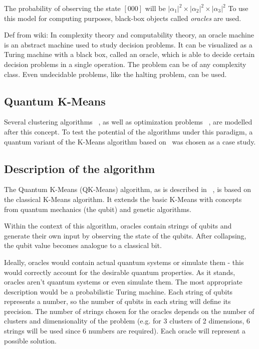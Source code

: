 The probability of observing the state $[000]$ will be $|\alpha_1|^2 \times |\alpha_2|^2 \times |\alpha_3|^2$
To use this model for computing purposes, black-box objects called \emph{oracles} are used.


Def from wiki: In complexity theory and computability theory, an oracle machine is an abstract machine used to study decision problems. It can be visualized as a Turing machine with a black box, called an oracle, which is able to decide certain decision problems in a single operation. The problem can be of any complexity class. Even undecidable problems, like the halting problem, can be used. %




\subsection{Quantum K-Means}

Several clustering algorithms ~\cite{Casper2013,Casper,Xiao2010}, as well as optimization problems ~\cite{Wang2013}, are modelled after this concept. To test the potential of the algorithms under this paradigm, a quantum variant of the K-Means algorithm based on~\cite{Casper} was chosen as a case study.

\subsection{Description of the algorithm}

The Quantum K-Means (QK-Means) algorithm, as is described in ~\cite{Casper}, is based on the classical K-Means algorithm. It extends the basic K-Means with concepts from quantum mechanics (the qubit) and genetic algorithms.

Within the context of this algorithm, oracles contain strings of qubits and generate their own input by observing the state of the qubits. After collapsing, the qubit value becomes analogue to a classical bit.


Ideally, oracles would contain actual quantum systems or simulate them - this would correctly account for the desirable quantum properties. As it stands, oracles aren't quantum systems or even simulate them. The most appropriate description would be a probabilistic Turing machine.
Each string of qubits represents a number, so the number of qubits in each string will define its precision. The number of strings chosen for the oracles depends on the number of clusters and dimensionality of the problem (e.g. for 3 clusters of 2 dimensions, 6 strings will be used since 6 numbers are required). Each oracle will represent a possible solution.

